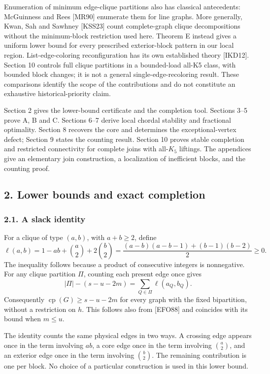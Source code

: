 \documentclass[english,11pt,a4paper]{article}
\begin{document}
Enumeration of minimum edge-clique partitions also has classical
antecedents: McGuinness and Rees {[}MR90{]} enumerate them for line
graphs. More generally, Kwan, Sah and Sawhney {[}KSS23{]} count
complete-graph clique decompositions without the minimum-block
restriction used here. Theorem E instead gives a uniform lower bound for
every prescribed exterior-block pattern in our local region.
List-edge-coloring reconfiguration has its own established theory
{[}IKD12{]}. Section 10 controls full clique partitions in a
bounded-load all-K5 class, with bounded block changes; it is not a
general single-edge-recoloring result. These comparisons identify the
scope of the contributions and do not constitute an exhaustive
historical-priority claim.

Section 2 gives the lower-bound certificate and the completion tool.
Sections 3--5 prove A, B and C. Sections 6--7 derive local chordal
stability and fractional optimality. Section 8 recovers the core and
determines the exceptional-vertex defect; Section 9 states the counting
result. Section 10 proves stable completion and restricted connectivity
for complete joins with all-\(K_5\) liftings. The appendices give an
elementary join construction, a localization of inefficient blocks, and
the counting proof.

\subsection{2. Lower bounds and exact
completion}\label{lower-bounds-and-exact-completion}

\subsubsection{2.1. A slack identity}\label{a-slack-identity}

For a clique of type \((a,b)\), with \(a+b\ge2\), define \[
\ell(a,b)=1-ab+\binom a2+2\binom b2
=\frac{(a-b)(a-b-1)+(b-1)(b-2)}2\ge0. \tag{10}
\] The inequality follows because a product of consecutive integers is
nonnegative. For any clique partition \(\Pi\), counting each present
edge once gives \[
|\Pi|-(s-u-2m)=\sum_{Q\in\Pi}\ell(a_Q,b_Q). \tag{11}
\] Consequently \(\operatorname{cp}(G)\ge s-u-2m\) for every graph with
the fixed bipartition, without a restriction on \(h\). This follows also
from {[}EFO88{]} and coincides with its bound when \(m\le u\).

The identity counts the same physical edges in two ways. A crossing edge
appears once in the term involving \(ab\), a core edge once in the term
involving \(\binom a2\), and an exterior edge once in the term involving
\(\binom b2\). The remaining contribution is one per block. No choice of
a particular construction is used in this lower bound.
\end{document}
